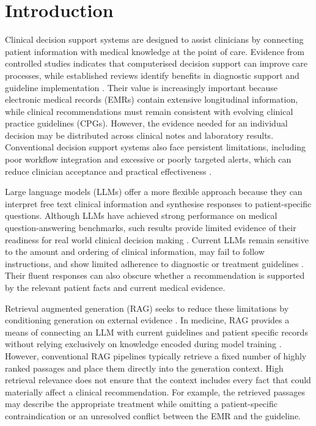 \documentclass[conference]{IEEEtran}
\begin{document}
\section{Introduction}
\label{sec:intro}

Clinical decision support systems are designed to assist clinicians by connecting patient information with medical knowledge at the point of care. Evidence from controlled studies indicates that computerised decision support can improve care processes, while established reviews identify benefits in diagnostic support and guideline implementation \cite{kwan2020computerised,sutton2020overview}. Their value is increasingly important because electronic medical records (EMRs) contain extensive longitudinal information, while clinical recommendations must remain consistent with evolving clinical practice guidelines (CPGs). However, the evidence needed for an individual decision may be distributed across clinical notes and laboratory results. Conventional decision support systems also face persistent limitations, including poor workflow integration and excessive or poorly targeted alerts, which can reduce clinician acceptance and practical effectiveness \cite{sutton2020overview}.

Large language models (LLMs) offer a more flexible approach because they can interpret free text clinical information and synthesise responses to patient-specific questions. Although LLMs have achieved strong performance on medical question-answering benchmarks, such results provide limited evidence of their readiness for real world clinical decision making \cite{hager2024evaluation}. Current LLMs remain sensitive to the amount and ordering of clinical information, may fail to follow instructions, and show limited adherence to diagnostic or treatment guidelines \cite{hager2024evaluation}. Their fluent responses can also obscure whether a recommendation is supported by the relevant patient facts and current medical evidence.

Retrieval augmented generation (RAG) seeks to reduce these limitations by conditioning generation on external evidence \cite{lewis2020rag}. In medicine, RAG provides a means of connecting an LLM with current guidelines and patient specific records without relying exclusively on knowledge encoded during model training \cite{kresevic2024optimization}. However, conventional RAG pipelines typically retrieve a fixed number of highly ranked passages and place them directly into the generation context. High retrieval relevance does not ensure that the context includes every fact that could materially affect a clinical recommendation. For example, the retrieved passages may describe the appropriate treatment while omitting a patient-specific contraindication or an unresolved conflict between the EMR and the guideline.
\end{document}
